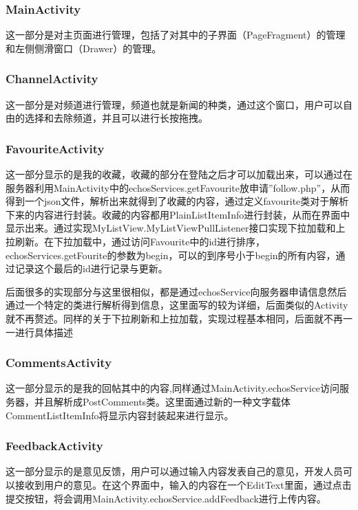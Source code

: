 \subsubsection{MainActivity}

这一部分是对主页面进行管理，包括了对其中的子界面（PageFragment）的管理和左侧侧滑窗口（Drawer）的管理。

\subsubsection{ChannelActivity}

这一部分是对频道进行管理，频道也就是新闻的种类，通过这个窗口，用户可以自由的选择和去除频道，并且可以进行长按拖拽。

\subsubsection{FavouriteActivity}

这一部分显示的是我的收藏，收藏的部分在登陆之后才可以加载出来，可以通过在服务器利用MainActivity中的echosServices.getFavourite放申请”follow.php”，从而得到一个json文件，解析出来就得到了收藏的内容，通过定义favourite类对于解析下来的内容进行封装。收藏的内容都用PlainListItemInfo进行封装，从而在界面中显示出来。通过实现MyListView.MyListViewPullListener接口实现下拉加载和上拉刷新。在下拉加载中，通过访问Favourite中的id进行排序，echosServices.getFourite的参数为begin，可以的到序号小于begin的所有内容，通过记录这个最后的id进行记录与更新。

后面很多的实现部分与这里很相似，都是通过echosService向服务器申请信息然后通过一个特定的类进行解析得到信息，这里面写的较为详细，后面类似的Activity就不再赘述。同样的关于下拉刷新和上拉加载，实现过程基本相同，后面就不再一一进行具体描述

\subsubsection{CommentsActivity}

这一部分显示的是我的回帖其中的内容,同样通过MainActivity.echosService访问服务器，并且解析成PostComments类。这里面通过新的一种文字载体CommentListItemInfo将显示内容封装起来进行显示。

\subsubsection{FeedbackActivity}
这一部分显示的是意见反馈，用户可以通过输入内容发表自己的意见，开发人员可以接收到用户的意见。在这个界面中，输入的内容在一个EditText里面，通过点击提交按钮，将会调用MainActivity.echosService.addFeedback进行上传内容。

